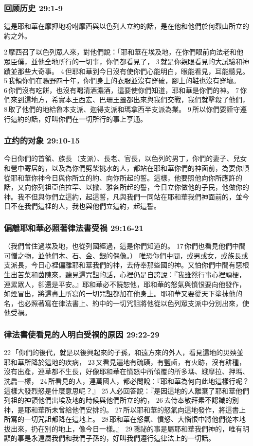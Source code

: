 \subsubsection{回顾历史 29:1-9}
這是耶和華在摩押地吩咐摩西與以色列人立約的話，是在他和他們於何烈山所立的約之外。

2 摩西召了以色列眾人來，對他們說：「耶和華在埃及地，在你們眼前向法老和他眾臣僕，並他全地所行的一切事，你們都看見了， 3 就是你親眼看見的大試驗和神蹟並那些大奇事。 4 但耶和華到今日沒有使你們心能明白，眼能看見，耳能聽見。 5 我領你們在曠野四十年，你們身上的衣服並沒有穿破，腳上的鞋也沒有穿壞。 6 你們沒有吃餅，也沒有喝清酒濃酒，這要使你們知道，耶和華是你們的神。 7 你們來到這地方，希實本王西宏、巴珊王噩都出來與我們交戰，我們就擊殺了他們， 8 取了他們的地給魯本支派、迦得支派和瑪拿西半支派為業。 9 所以你們要謹守遵行這約的話，好叫你們在一切所行的事上亨通。 

\subsubsection{立约的对象 29:10-15}
今日你們的首領、族長 （支派）、長老、官長，以色列的男丁，你們的妻子、兒女和營中寄居的，以及為你們劈柴挑水的人，都站在耶和華你們的神面前，為要你順從耶和華你神今日與你所立的約、向你所起的誓。這樣，他要照他向你所應許的話，又向你列祖亞伯拉罕、以撒、雅各所起的誓，今日立你做他的子民，他做你的神。我不但與你們立這約，起這誓，凡與我們一同站在耶和華我們神面前的，並今日不在我們這裡的人，我也與他們立這約，起這誓。

\subsubsection{偏離耶和華必照著律法書受禍 29:16-21}
（我們曾住過埃及地，也從列國經過，這是你們知道的。 17 你們也看見他們中間可憎之物，並他們木、石、金、銀的偶像。） 唯恐你們中間，或男或女，或族長或支派長，今日心裡偏離耶和華我們的神，去侍奉那些國的神。又怕你們中間有惡根生出苦菜和茵陳來，聽見這咒詛的話，心裡仍是自誇說：『我雖然行事心裡頑梗，連累眾人，卻還是平安。』耶和華必不饒恕他，耶和華的怒氣與憤恨要向他發作，如煙冒出，將這書上所寫的一切咒詛都加在他身上。耶和華又要從天下塗抹他的名，也必照著寫在律法書上、約中的一切咒詛將他從以色列眾支派中分別出來，使他受禍。

\subsubsection{律法書使看見的人明白受禍的原因 29:22-29}
22 「你們的後代，就是以後興起來的子孫，和遠方來的外人，看見這地的災殃並耶和華所降於這地的疾病， 23 又看見遍地有硫磺，有鹽鹵，有火跡，沒有耕種，沒有出產，連草都不生長，好像耶和華在憤怒中所傾覆的所多瑪、蛾摩拉、押瑪、洗扁一樣， 24 所看見的人，連萬國人，都必問說：『耶和華為何向此地這樣行呢？這樣大發烈怒是什麼意思呢？』 25 人必回答說：『是因這地的人離棄了耶和華他們列祖的神領他們出埃及地的時候與他們所立的約， 26 去侍奉敬拜素不認識的別神，是耶和華所未曾給他們安排的。 27 所以耶和華的怒氣向這地發作，將這書上所寫的一切咒詛都降在這地上。 28 耶和華在怒氣、憤怒、大惱恨中將他們從本地拔出來，扔在別的地上，像今日一樣。』 29 隱祕的事是屬耶和華我們神的，唯有明顯的事是永遠屬我們和我們子孫的，好叫我們遵行這律法上的一切話。


